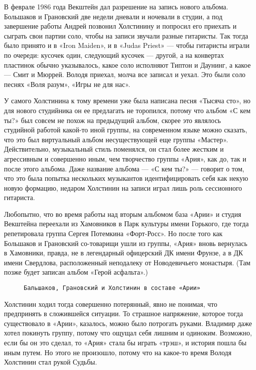 В феврале 1986 года Векштейн дал разрешение на запись нового альбома. Большаков и Грановский две недели дневали и
ночевали в студии, а под завершение работы Андрей позвонил Холстинину и попросил его приехать и сыграть свои партии
соло, чтобы на записи звучали разные гитаристы. Так тогда было принято и в «Iron Maiden», и в «Judas Priest» — чтобы
гитаристы играли по очереди: кусочек один, следующий кусочек — другой, а на конвертах пластинок обычно указывалось,
какое соло исполняют Типтон и Даунинг, а какое — Смит и Мюррей. Володя приехал, молча все записал и уехал. Это были соло
песнях «Воля разум», «Игры не для нас».

У самого Холстинина к тому времени уже была написана песня «Тысяча сто», но для нового студийника он ее предлагать не
торопился, потому что альбом «С кем ты?» был совсем не похож на предыдущий альбом, скорее это являлось студийной работой
какой-то иной группы, на современном языке можно сказать, что это был виртуальный альбом несуществующей еще группы
«Мастер». Действительно, музыкальный стиль поменялся, он стал более жестким и агрессивным и совершенно иным, чем
творчество группы «Ария», как до, так и после этого альбома. Даже название альбома — «С кем ты?» — говорит о том, что
это была попытка нескольких музыкантов идентифицировать себя как некую новую формацию, недаром Холстинин на записи играл
лишь роль сессионного гитариста.

Любопытно, что во время работы над вторым альбомом база «Арии» и студия Векштейна переехали из Хамовников в Парк
культуры имени Горького, где тогда репетировала группа Сергея Потемкина «Форт-Росс». Но после того как Большаков и
Грановский со-товарищи ушли из группы, «Ария» вновь вернулась в Хамовники, правда, не в легендарный офицерский ДК имени
Фрунзе, а в ДК имени Свердлова, расположенный неподалеку от Новодевичьего монастыря. (Там позже будет записан альбом
«Герой асфальта».)

\begin{figure}[h]
    \centering
    \caption{\texttt{Бальшаков, Грановский и Холстинин в составе «Арии»}}
\end{figure}

Холстинин ходил тогда совершенно потерянный, явно не понимая, что предпринять в сложившейся ситуации. То страшное
напряжение, которое тогда существовало в «Арии», казалось, можно было потрогать руками. Владимир даже хотел покинуть
группу, потому что ощущал себя лишним и одиноким. Возможно, если бы он это сделал, то «Ария» стала бы играть «трэш», и
история пошла бы иным путем. Но этого не произошло, потому что на какое-то время Володя Холстинин стал рукой Судьбы.

